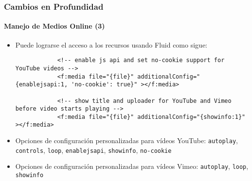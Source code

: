 \begin{frame}[fragile]
	\frametitle{Cambios en Profundidad}
	\framesubtitle{Manejo de Medios Online (3)}

	\lstset{basicstyle=\tiny\ttfamily}

	\begin{itemize}

		\item Puede lograrse el acceso a los recursos usando Fluid como sigue:

		\begin{lstlisting}
			<!-- enable js api and set no-cookie support for YouTube videos -->
			<f:media file="{file}" additionalConfig="{enablejsapi:1, 'no-cookie': true}" ></f:media>

			<!-- show title and uploader for YouTube and Vimeo before video starts playing -->
			<f:media file="{file}" additionalConfig="{showinfo:1}" ></f:media>
		\end{lstlisting}

		\item Opciones de configuración personalizadas para vídeos YouTube:\newline
			\small
				\texttt{autoplay}, \texttt{controls}, \texttt{loop}, \texttt{enablejsapi}, \texttt{showinfo}, \texttt{no-cookie}
			\normalsize

		\item Opciones de configuración personalizadas para vídeos Vimeo:\newline
			\small
				\texttt{autoplay}, \texttt{loop}, \texttt{showinfo}
			\normalsize
	\end{itemize}

\end{frame}


